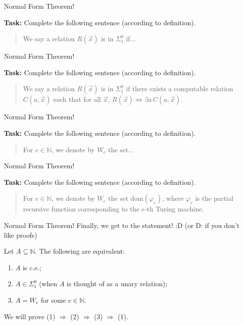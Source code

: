\documentclass{beamer}
\begin{document}
\begin{frame}{Normal Form Theorem!}

\textbf{Task:} Complete the following sentence (according to definition).

\begin{quotation}
We say a relation $R(\vec{x})$ is in $\Sigma^0_1$ if...
\end{quotation}
\end{frame}

\begin{frame}{Normal Form Theorem!}

\textbf{Task:} Complete the following sentence (according to definition).

\begin{quotation}
We say a relation $R(\vec{x})$ is in $\Sigma^0_1$ if there exists a computable relation $C(a, \vec{x})$ such that for all $\vec{x}$, $R(\vec{x}) \Leftrightarrow \exists a \, C(a, \vec{x})$.
\end{quotation}
\end{frame}

\begin{frame}{Normal Form Theorem!}

\textbf{Task:} Complete the following sentence (according to definition).

\begin{quotation}
For $e \in \mathbb N$, we denote by $W_e$ the set...
\end{quotation}
\end{frame}

\begin{frame}{Normal Form Theorem!}

\textbf{Task:} Complete the following sentence (according to definition).

\begin{quotation}
For $e \in \mathbb N$, we denote by $W_e$ the set $\text{dom}(\varphi_e)$, where $\varphi_e$ is the partial recursive function corresponding to the $e$-th Turing machine.
\end{quotation}
\end{frame}

\begin{frame}{Normal Form Theorem!}
Finally, we get to the statement! :D (or D: if you don't like proofs)

\begin{theorem}
Let $A \subseteq \mathbb N$. The following are equivalent:
\begin{enumerate}
\item $A$ is c.e.;
\item $A \in \Sigma^0_1$ (when $A$ is thought of as a unary relation);
\item $A = W_e$ for some $e \in \mathbb N$.
\end{enumerate}
\end{theorem}

We will prove (1) $\Rightarrow$ (2) $\Rightarrow$ (3) $\Rightarrow$ (1).
\end{frame}
\end{document}
